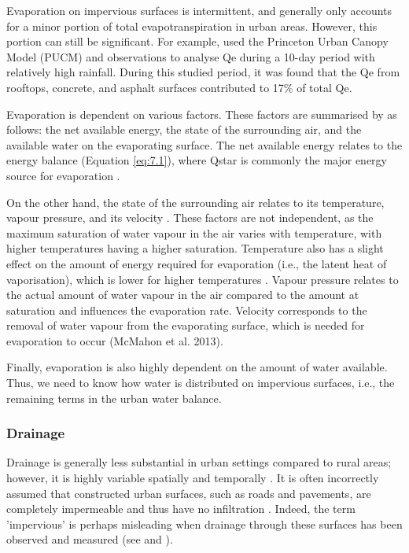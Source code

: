\documentclass[final,3p,times,authoryear]{elsarticle}
\begin{document}
Evaporation on impervious surfaces is intermittent, and generally only accounts for a minor portion of total evapotranspiration in urban areas. However, this portion can still be significant. For example, \cite{Ramamurthy2014} used the Princeton Urban Canopy Model (PUCM) and observations to analyse \gls{Qe} during a 10-day period with relatively high rainfall. During this studied period, it was found that the \gls{Qe} from rooftops, concrete, and asphalt surfaces contributed to 17\% of total \gls{Qe}.

Evaporation is dependent on various factors. These factors are summarised by \cite{Monteith1991} as follows: the net available energy, the state of the surrounding air, and the available water on the evaporating surface. The net available energy relates to the energy balance (Equation \ref{eq:7.1}), where \gls{Qstar} is commonly the major energy source for evaporation \citep{Penman1948,McMahon2013}.

On the other hand, the state of the surrounding air relates to its temperature, vapour pressure, and its velocity \citep{McMahon2013}. These factors are not independent, as the maximum saturation of water vapour in the air varies with temperature, with higher temperatures having a higher saturation. Temperature also has a slight effect on the amount of energy required for evaporation (i.e., the latent heat of vaporisation), which is lower for higher temperatures \citep{Shuttleworth2012}. Vapour pressure relates to the actual amount of water vapour in the air compared to the amount at saturation and influences the evaporation rate. Velocity corresponds to the removal of water vapour from the evaporating surface, which is needed for evaporation to occur (McMahon et al. 2013).

Finally, evaporation is also highly dependent on the amount of water available. Thus, we need to know how water is distributed on impervious surfaces, i.e., the remaining terms in the urban water balance.

\subsubsection{Drainage}\label{sec:appendix7.1.3.2}

Drainage is generally less substantial in urban settings compared to rural areas; however, it is highly variable spatially and temporally \citep{Raimbault2001}. It is often incorrectly assumed that constructed urban surfaces, such as roads and pavements, are completely impermeable and thus have no infiltration \citep{Redfern2016}. Indeed, the term 'impervious' is perhaps misleading when drainage through these surfaces has been observed and measured (see \cite{Rammal2020} and \cite{Redfern2016}).
\end{document}
